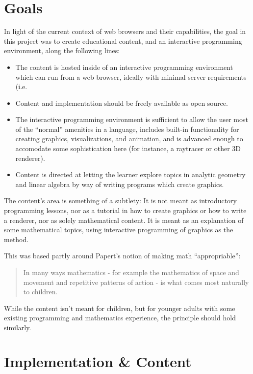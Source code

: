 \documentclass{sig-alternate-05-2015}
\begin{document}
\section{Goals}

In light of the current context of web browsers and their
capabilities, the goal in this project was to create educational
content, and an interactive programming environment, along the
following lines:

\begin{itemize}
\item The content is hosted inside of an interactive programming
  environment which can run from a web browser, ideally with minimal
  server requirements (i.e. 
\item Content and implementation should be freely available as
  open source.
\item The interactive programming environment is sufficient to allow
  the user most of the ``normal'' amenities in a language, includes
  built-in functionality for creating graphics, visualizations, and
  animation, and is advanced enough to accomodate some sophistication
  here (for instance, a raytracer or other 3D renderer).
\item Content is directed at letting the learner explore topics in
  analytic geometry and linear algebra by way of writing programs
  which create graphics.
\end{itemize}

The content's area is something of a subtlety: It is not meant as
introductory programming lessons, nor as a tutorial in how to create
graphics or how to write a renderer, nor as solely mathematical
content. It is meant as an explanation of some mathematical topics,
using interactive programming of graphics as the method.

This was based partly around Papert's notion of making math
``appropriable'': \blockquote{In many ways mathematics - for example
  the mathematics of space and movement and repetitive patterns of
  action - is what comes most naturally to
  children.}\cite{Papert:1993} While the content isn't meant for
children, but for younger adults with some existing programming and
mathematics experience, the principle should hold similarly.


\section{Implementation \& Content}
\end{document}
